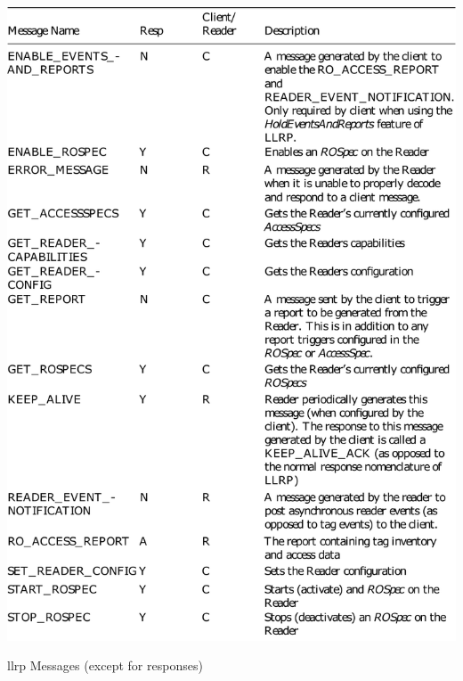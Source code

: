 \begin{appendices}
\begin{table}
    \centering
    \includegraphics[width=\textwidth]{./figs/02-state-of-the-art/table_llrpmessages_2.pdf}
    \caption{\ac{llrp} Messages (except for responses)~\cite{ImpinjLTKProgrammers}} 
    \label{tab:llrpmessages2}
\end{table}

\end{appendices}